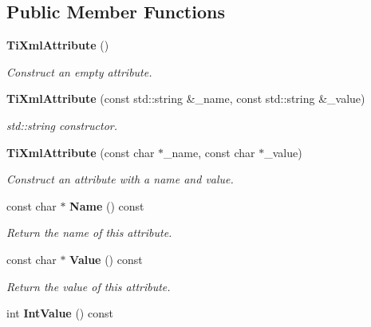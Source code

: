 \subsection*{Public Member Functions}
\begin{CompactItemize}
\item 
{\bf Ti\-Xml\-Attribute} ()\label{classTiXmlAttribute_TiXmlAttributea0}

\begin{CompactList}\small\item\em Construct an empty attribute. \item\end{CompactList}\item 
{\bf Ti\-Xml\-Attribute} (const std::string \&\_\-name, const std::string \&\_\-value)\label{classTiXmlAttribute_TiXmlAttributea1}

\begin{CompactList}\small\item\em std::string constructor. \item\end{CompactList}\item 
{\bf Ti\-Xml\-Attribute} (const char $\ast$\_\-name, const char $\ast$\_\-value)\label{classTiXmlAttribute_TiXmlAttributea2}

\begin{CompactList}\small\item\em Construct an attribute with a name and value. \item\end{CompactList}\item 
const char $\ast$ {\bf Name} () const\label{classTiXmlAttribute_TiXmlAttributea3}

\begin{CompactList}\small\item\em Return the name of this attribute. \item\end{CompactList}\item 
const char $\ast$ {\bf Value} () const\label{classTiXmlAttribute_TiXmlAttributea4}

\begin{CompactList}\small\item\em Return the value of this attribute. \item\end{CompactList}\item 
int {\bf Int\-Value} () const\label{classTiXmlAttribute_TiXmlAttributea5}


\end{CompactItemize}
